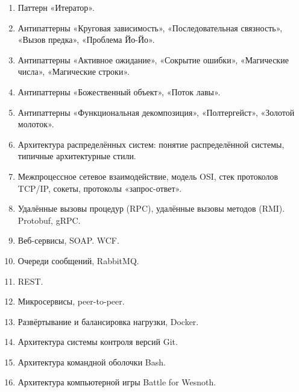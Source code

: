 \documentclass[a5paper]{article}
\begin{document}
\begin{enumerate}
    \item Паттерн «Итератор».
    \item Антипаттерны «Круговая зависимость», «Последовательная связность», «Вызов предка», «Проблема Йо-Йо».
    \item Антипаттерны «Активное ожидание», «Сокрытие ошибки», «Магические числа», «Магические строки».
    \item Антипаттерны «Божественный объект», «Поток лавы».
    \item Антипаттерны «Функциональная декомпозиция», «Полтергейст», «Золотой молоток».
    \item Архитектура распределённых систем: понятие распределённой системы, типичные архитектурные стили.
    \item Межпроцессное сетевое взаимодействие, модель OSI, стек протоколов TCP/IP, сокеты, протоколы «запрос-ответ».
    \item Удалённые вызовы процедур (RPC), удалённые вызовы методов (RMI). Protobuf, gRPC.
    \item Веб-сервисы, SOAP. WCF.
    \item Очереди сообщений, RabbitMQ.
    \item REST.
    \item Микросервисы, peer-to-peer.
    \item Развёртывание и балансировка нагрузки, Docker.
    \item Архитектура системы контроля версий Git.
    \item Архитектура командной оболочки Bash.
    \item Архитектура компьютерной игры Battle for Wesnoth.

\end{enumerate}
\end{document}
